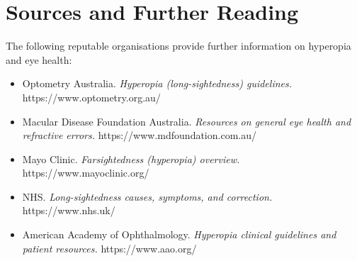 \section*{Sources and Further Reading}
The following reputable organisations provide further information on hyperopia and eye health:
\begin{itemize}
    \item Optometry Australia. \textit{Hyperopia (long-sightedness) guidelines.} https://www.optometry.org.au/
    \item Macular Disease Foundation Australia. \textit{Resources on general eye health and refractive errors.} https://www.mdfoundation.com.au/
    \item Mayo Clinic. \textit{Farsightedness (hyperopia) overview.} https://www.mayoclinic.org/
    \item NHS. \textit{Long-sightedness causes, symptoms, and correction.} https://www.nhs.uk/
    \item American Academy of Ophthalmology. \textit{Hyperopia clinical guidelines and patient resources.} https://www.aao.org/
\end{itemize}
